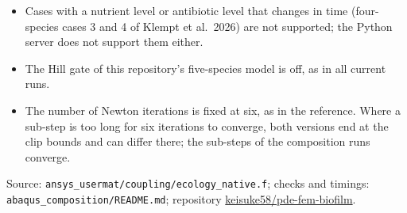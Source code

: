 \documentclass[11pt,a4paper]{article}
\newcommand{\sect}[1]{\par\vspace{6pt}{\color{c3}\large\bfseries #1}\par\vspace{2pt}}
\newcommand{\file}[1]{\texttt{\small #1}}
\begin{document}
\sect{Limits}
\begin{itemize}
\item Cases with a nutrient level or antibiotic level that changes in time
  (four-species cases 3 and 4 of Klempt et al.\ 2026) are not supported; the
  Python server does not support them either.
\item The Hill gate of this repository's five-species model is off, as in all
  current runs.
\item The number of Newton iterations is fixed at six, as in the reference. Where a
  sub-step is too long for six iterations to converge, both versions end at the
  clip bounds and can differ there; the sub-steps of the composition runs
  converge.
\end{itemize}

\vspace{4pt}
{\small\raggedright Source: \file{ansys\_usermat/coupling/ecology\_native.f}; checks and
timings: \file{abaqus\_composition/README.md}; repository
\href{https://github.com/keisuke58/pde-fem-biofilm}{keisuke58/pde-fem-biofilm}.}
\end{document}
